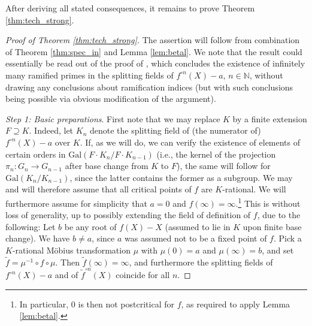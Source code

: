 \documentclass[a4paper]{amsart}
\begin{document}
  
  After deriving all stated consequences, it remains to prove Theorem \ref{thm:tech_strong}.
  \begin{proof}[Proof of Theorem \ref{thm:tech_strong}]
 The assertion will follow from combination of Theorem \ref{thm:spec_in} and Lemma \ref{lem:betal}. We note that the result could essentially be read out of the proof of \cite[Theorem 5]{Betal}, which concludes the existence of infinitely many ramified primes in the splitting fields of  $f^{\circ n}(X)-a$, $n\in \mathbb{N}$, without drawing any conclusions about ramification indices (but with such conclusions being possible via obvious modification of the argument).

{\it Step 1: Basic preparations}. 
First note that we may replace $K$ by a finite extension $F\supseteq K$. Indeed, let $K_n$ denote the splitting field of (the numerator of) $f^{\circ n}(X)-a$ over $K$. If, as we will do, we can verify the existence of elements of certain orders in $\textrm{Gal}(F\cdot K_n/F\cdot K_{n-1})$ (i.e., the kernel of the projection $\pi_n: G_n\to G_{n-1}$ after base change from $K$ to $F$), the same will follow for $\textrm{Gal}(K_n/K_{n-1})$, since the latter contains the former as a subgroup. We may and will therefore assume that all critical points of $f$ are $K$-rational. 
We will furthermore assume for simplicity that $a=0$ and $f(\infty)=\infty$.\footnote{In particular, $0$ is then not postcritical for $f$, as required to apply Lemma \ref{lem:betal}.} This is without loss of generality, up to possibly extending the field of definition of $f$, due to the following: Let $b$ be any root of $f(X)-X$ (assumed to lie in $K$ upon finite base change). We have $b\ne a$, since $a$ was assumed not to be a fixed point of $f$. %
Pick a $K$-rational M\"obius transformation $\mu$ with $\mu(0)=a$ and $\mu(\infty)=b$, and set $\tilde{f}=\mu^{-1}\circ f\circ \mu$. Then $\tilde{f}(\infty)=\infty$, and furthermore the splitting fields of $f^{\circ n}(X)-a$ and of $\tilde{f}^{\circ n}(X)$ coincide for all $n$.


\end{proof}
\end{document}
